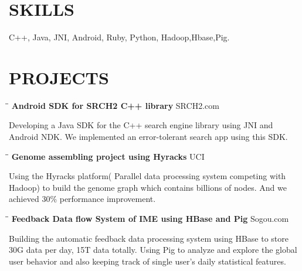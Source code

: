 \documentclass{res}
\begin{document}
\begin{resume}
\section{SKILLS}          
    C++, Java, JNI, Android, Ruby, Python, Hadoop,Hbase,Pig.
 
\section{PROJECTS}
   \vspace{-0.1in}	
   \begin{tabbing}
   \hspace{2.5in}\= \hspace{3in}\= \kill %
    {\bf Android SDK for SRCH2 C++ library }\>  \>SRCH2.com\\
   \end{tabbing}\vspace{-30pt}      %
   Developing a Java SDK for the C++ search engine library using JNI and Android NDK.
   We implemented an error-tolerant search app using this SDK. 
   \vspace{-0.1in}	
   \begin{tabbing}
   \hspace{2.5in}\= \hspace{3in}\= \kill %
    {\bf Genome assembling project using Hyracks }\> \>UCI     \\
   \end{tabbing}\vspace{-30pt}      %
   Using the Hyracks platform( Parallel data processing system competing with Hadoop) to build the genome graph which contains billions of nodes. And we achieved 30\% performance improvement.
%
   \vspace{-0.1in}	
   \begin{tabbing}
   \hspace{2.5in}\= \hspace{3in}\= \kill %
    {\bf Feedback Data flow System of IME using HBase and Pig}\> \>Sogou.com     \\
   \end{tabbing}\vspace{-30pt}      %
   Building the automatic feedback data processing system using HBase to store 30G data per day, 15T data totally. Using Pig to analyze and explore the global user behavior and also keeping track of single user's daily statistical features. 

\end{resume}
\end{document}
